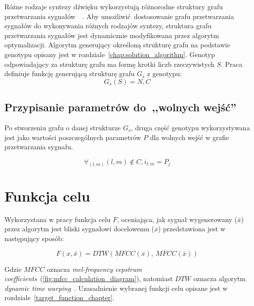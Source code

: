 Różne rodzaje syntezy dźwięku wykorzystują różnorodne struktury grafu przetwarzania
sygnałów~\cite{minilogue_diagram}~\cite{digitone_manual}.
Aby umożliwić dostosowanie grafu przetwarzania sygnałów do wykonywania różnych
rodzajów syntezy, struktura grafu przetwarzania sygnałów jest dynamicznie
modyfikowana przez algorytm optymalizacji. Algorytm generujący określoną
strukturę grafu na podstawie genotypu opisany jest w rozdziale~\ref{chap:solution_algorithm}.
Genotyp odpowiadający za strukturę grafu ma formę krotki liczb rzeczywistych $S$.
Praca definiuje funkcję generującą strukturę grafu $G_s$ z genotypu:
\begin{equation}
  G_s(S) = N, C
  \label{eq:graph_structure_generation_function}
\end{equation}

\subsection{Przypisanie parametrów do~,,wolnych wejść''}\label{sec:graph_params_definition}

Po stworzeniu grafu o danej strukturze $G_s$, druga część genotypu wykorzystywana
jest jako wartości poszczególnych parametrów $P$ dla wolnych wejść w grafie przetwarzania
sygnału.

\begin{equation}
  \forall_{(l,m)} (l, m) \notin C, i_{l,m} = P_j
  \label{eq:graph_params_assignment}
\end{equation}

\section{Funkcja celu}

Wykorzystana w pracy funkcja celu $F$, oceniająca, jak sygnał wygenerowany ($\bar{x}$) przez algorytm
jest bliski sygnałowi docelowemu ($x$) przedstawiona jest w następujący sposób:

\begin{equation}
  F(x, \bar{x}) = DTW(MFCC(x),~MFCC(\bar{x}))
  \label{eq:target_function}
\end{equation}

\noindent
Gdzie $MFCC$ oznacza \textit{mel-frequency cepstrum coefficients}~(\ref{fig:mfcc_calculation_diagram}),
natomiast $DTW$ oznacza algorytm \textit{dynamic time warping}~\cite{mfcc_dtw}.
Uzasadnienie wybranej funkcji celu opisane jest w rozdziale~\ref{target_function_chapter}.


